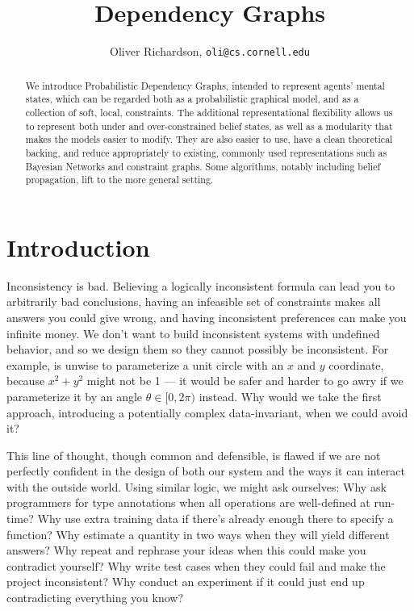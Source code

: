 \documentclass{article}
\title{Dependency Graphs}
\author{Oliver Richardson,  \texttt{oli@cs.cornell.edu}}
\newcommand{\modelnames}{Probabilistic Dependency Graphs}
\begin{document}
	\maketitle
	
	\begin{abstract}
		We introduce \modelnames, intended to represent agents' mental states, which can be regarded both as a probabilistic graphical model, and as a collection of soft, local, constraints. The additional representational flexibility allows us to represent both under and over-constrained belief states, as well as a modularity that makes the models easier to modify. They are also easier to use, have a clean theoretical backing, and reduce appropriately to existing, commonly used representations such as Bayesian Networks and constraint graphs. Some algorithms, notably including belief propagation, lift to the more general setting.
	\end{abstract}
	
	\section{Introduction}
	Inconsistency is bad. Believing a logically inconsistent formula can lead you to arbitrarily bad conclusions, having an infeasible set of constraints makes all answers you could give wrong, and having inconsistent preferences can make you infinite money. We don't want to build inconsistent systems with undefined behavior, and so we design them so they cannot possibly be inconsistent. For example, is unwise to parameterize a unit circle with an $x$ and $y$ coordinate, because $x^2+ y^2$ might not be 1 --- it would be safer and harder to go awry if we parameterize it by an angle $\theta \in [0, 2\pi)$ instead. Why would we take the first approach, introducing a potentially complex data-invariant, when we could avoid it?
	
	This line of thought, though common and defensible, is flawed if we are not perfectly confident in the design of both our system and the ways it can interact with the outside world. Using similar logic, we might ask ourselves: Why ask programmers for type annotations when all operations are well-defined at run-time?  Why use extra training data if there's already enough there to specify a function? Why estimate a quantity in two ways when they will yield different answers? Why repeat and rephrase your ideas when this could make you contradict yourself? Why write test cases when they could fail and make the project inconsistent? Why conduct an experiment if it could just end up contradicting everything you know?
	
\end{document}
